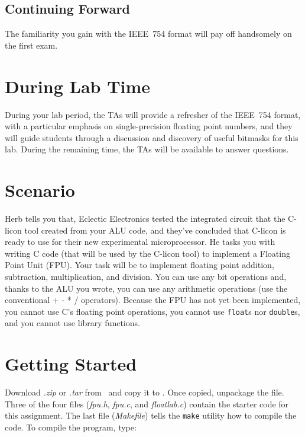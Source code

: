     \subsection*{Continuing Forward}

    The familiarity you gain with the IEEE~754 format will pay off handsomely on the first exam.

    \section*{During Lab Time}

    During your lab period, the TAs will provide a refresher of the IEEE~754 format, with a particular emphasis on single-precision floating point numbers, and they will guide students through a discussion and discovery of useful bitmasks for this lab.
    During the remaining time, the TAs will be available to answer questions.

    \softwareengineeringfrontmatter


    \section{Scenario}

    Herb tells you that, Eclectic Electronics tested the integrated circuit that the C-licon tool created from your ALU code, and they've concluded that C-licon is ready to use for their new experimental microprocessor.
    He tasks you with writing C code (that will be used by the C-licon tool) to implement a Floating Point Unit (FPU).
    Your task will be to implement floating point addition, subtraction, multiplication, and division.
    You can use any bit operations and, thanks to the ALU you wrote, you can use any arithmetic operations (use the conventional + - * / operators).
    Because the FPU has not yet been implemented, you cannot use C's floating point operations, you cannot use \lstinline{float}s nor \lstinline{double}s, and you cannot use library functions.


    \section{Getting Started}

    Download \textit{\shortlabname.zip} or \textit{\shortlabname.tar} from \filesource\ and copy it to \runtimeenvironment.
    Once copied, unpackage the file.
    Three of the four files (\textit{fpu.h}, \textit{fpu.c}, and \textit{floatlab.c}) contain the starter code for this assignment.
    The last file (\textit{Makefile}) tells the \texttt{make} utility how to compile the code.
    To compile the program, type:

